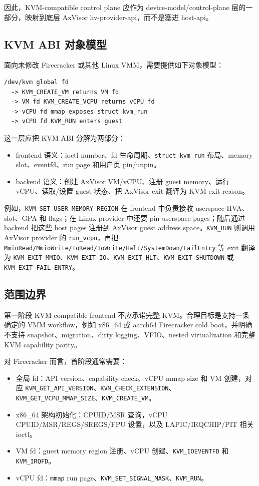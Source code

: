\documentclass[a4paper,11pt]{article}
\begin{document}
因此，KVM-compatible control plane 应作为 device-model/control-plane 层的一部分，映射到底层 AxVisor hv-provider-api，而不是塞进 host-api。

\subsection{KVM ABI 对象模型}

面向未修改 Firecracker 或其他 Linux VMM，需要提供如下对象模型：

\begin{lstlisting}
/dev/kvm global fd
  -> KVM_CREATE_VM returns VM fd
  -> VM fd KVM_CREATE_VCPU returns vCPU fd
  -> vCPU fd mmap exposes struct kvm_run
  -> vCPU fd KVM_RUN enters guest
\end{lstlisting}

这一层应把 KVM ABI 分解为两部分：

\begin{itemize}
  \item frontend 语义：ioctl number、fd 生命周期、\texttt{struct kvm\_run} 布局、memory slot、eventfd、run page 和用户页 pin/unpin。
  \item backend 语义：创建 AxVisor VM/vCPU、注册 guest memory、运行 vCPU、读取/设置 guest 状态、把 AxVisor exit 翻译为 KVM exit reason。
\end{itemize}

例如，\texttt{KVM\_SET\_USER\_MEMORY\_REGION} 在 frontend 中负责接收 userspace HVA、slot、GPA 和 flags；在 Linux provider 中还要 pin userspace pages；随后通过 backend 把这些 host pages 注册到 AxVisor guest address space。\texttt{KVM\_RUN} 则调用 AxVisor provider 的 \texttt{run\_vcpu}，再把 \texttt{MmioRead/MmioWrite/IoRead/IoWrite/Halt/SystemDown/FailEntry} 等 exit 翻译为 \texttt{KVM\_EXIT\_MMIO}、\texttt{KVM\_EXIT\_IO}、\texttt{KVM\_EXIT\_HLT}、\texttt{KVM\_EXIT\_SHUTDOWN} 或 \texttt{KVM\_EXIT\_FAIL\_ENTRY}。

\subsection{范围边界}

第一阶段 KVM-compatible frontend 不应承诺完整 KVM。合理目标是支持一条确定的 VMM workflow，例如 x86\_64 或 aarch64 Firecracker cold boot，并明确不支持 snapshot、migration、dirty logging、VFIO、nested virtualization 和完整 KVM capability parity。

对 Firecracker 而言，首阶段通常需要：

\begin{itemize}
  \item 全局 fd：API version、capability check、vCPU mmap size 和 VM 创建，对应 \texttt{KVM\_GET\_API\_VERSION}、\texttt{KVM\_CHECK\_EXTENSION}、\texttt{KVM\_GET\_VCPU\_MMAP\_SIZE}、\texttt{KVM\_CREATE\_VM}。
  \item x86\_64 架构初始化：CPUID/MSR 查询，vCPU CPUID/MSR/REGS/SREGS/FPU 设置，以及 LAPIC/IRQCHIP/PIT 相关 ioctl。
  \item VM fd：guest memory region 注册、vCPU 创建、\texttt{KVM\_IOEVENTFD} 和 \texttt{KVM\_IRQFD}。
  \item vCPU fd：\texttt{mmap} run page、\texttt{KVM\_SET\_SIGNAL\_MASK}、\texttt{KVM\_RUN}。
\end{itemize}
\end{document}

